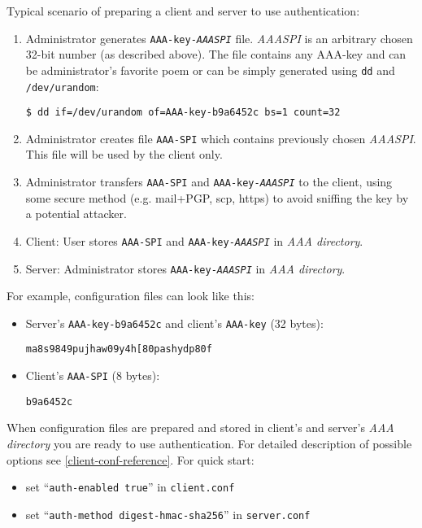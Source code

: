 Typical scenario of preparing a client and server to use authentication:
\begin{enumerate}
 \item Administrator generates \texttt{AAA-key-\textit{AAASPI}}
   file. \textit{AAASPI} is an arbitrary chosen 32-bit number (as
   described above). The file contains any AAA-key and can be
   administrator's favorite poem or can be simply generated using
   \texttt{dd} and \texttt{/dev/urandom}:
\begin{lstlisting}
$ dd if=/dev/urandom of=AAA-key-b9a6452c bs=1 count=32
\end{lstlisting}

\item Administrator creates file \texttt{AAA-SPI} which contains
  previously chosen \textit{AAASPI}. This file will be used by the
  client only.

\item Administrator transfers \texttt{AAA-SPI} and
  \texttt{AAA-key-\textit{AAASPI}} to the client, using some secure
  method (e.g. mail+PGP, scp, https) to avoid sniffing the key by a
  potential attacker.

\item Client: User stores \texttt{AAA-SPI} and
  \texttt{AAA-key-\textit{AAASPI}} in \textit{AAA directory}.

\item Server: Administrator stores \texttt{AAA-key-\textit{AAASPI}} in
  \textit{AAA directory}.

\end{enumerate}

For example, configuration files can look like this:

\begin{itemize}
\item Server's \texttt{AAA-key-b9a6452c} and client's \texttt{AAA-key}
  (32 bytes):
\begin{lstlisting}
ma8s9849pujhaw09y4h[80pashydp80f
\end{lstlisting}

\item Client's \texttt{AAA-SPI} (8 bytes):
\begin{lstlisting}
b9a6452c
\end{lstlisting}
\end{itemize}

When configuration files are prepared and stored in client's and
server's \textit{AAA directory} you are ready to use
authentication. For detailed description of possible options see
\ref{client-conf-reference}. For quick start:
\begin{itemize}
 \item set ``\texttt{auth-enabled true}'' in \texttt{client.conf}

 \item set ``\texttt{auth-method digest-hmac-sha256}'' in
   \texttt{server.conf}

\end{itemize}

